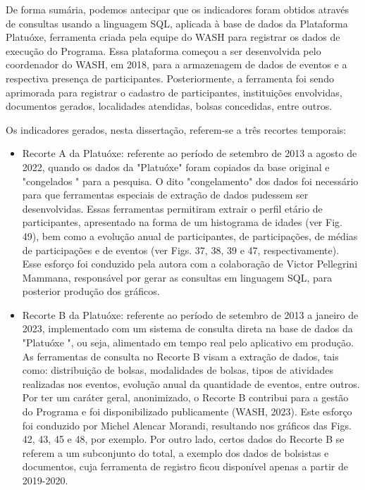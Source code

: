 De forma sumária, podemos antecipar que os indicadores foram obtidos através de consultas usando a linguagem SQL, aplicada à base de dados da Plataforma Platuóxe, ferramenta criada pela equipe do WASH para registrar os dados de execução do Programa. Essa plataforma começou a ser desenvolvida pelo coordenador do WASH, em 2018, para a armazenagem de dados de eventos e a respectiva presença de participantes. Posteriormente, a ferramenta foi sendo aprimorada para registrar o cadastro de participantes, instituições envolvidas, documentos gerados, localidades atendidas, bolsas concedidas, entre outros.

Os indicadores gerados, nesta dissertação, referem-se a três recortes temporais:


\begin{itemize}
\item Recorte A da Platuóxe: referente ao período de setembro de 2013 a agosto de 2022, quando os dados da "Platuóxe" foram copiados da base original e "congelados " para a pesquisa. O dito  "congelamento" dos dados foi necessário para que ferramentas especiais de extração de dados pudessem ser desenvolvidas. Essas ferramentas permitiram extrair o perfil etário de participantes, apresentado na forma de um histograma de idades (ver Fig. 49), bem como a evolução anual de participantes, de participações, de médias de participações e de eventos (ver Figs. 37, 38, 39 e 47, respectivamente). Esse esforço foi conduzido pela autora com a colaboração de Victor Pellegrini Mammana, responsável por gerar as consultas em linguagem SQL, para posterior produção dos gráficos.
\item Recorte B da Platuóxe: referente ao período de setembro de 2013 a janeiro de 2023, implementado com um sistema de consulta direta na base de dados da "Platuóxe ", ou seja, alimentado em tempo real pelo aplicativo em produção. As ferramentas de consulta no Recorte B visam a extração de dados, tais como: distribuição de bolsas, modalidades de bolsas, tipos de atividades realizadas nos eventos, evolução anual da quantidade de eventos,  entre outros. Por ter um caráter geral, anonimizado, o Recorte B contribui para a gestão do Programa e foi disponibilizado publicamente  (WASH, 2023). Este esforço foi conduzido por Michel Alencar Morandi, resultando nos gráficos das  Figs. 42, 43, 45 e 48, por exemplo. Por outro lado, certos dados do Recorte B se referem a um subconjunto do total, a exemplo dos dados de bolsistas e documentos, cuja ferramenta de registro ficou disponível apenas a partir de 2019-2020.

\end{itemize}
